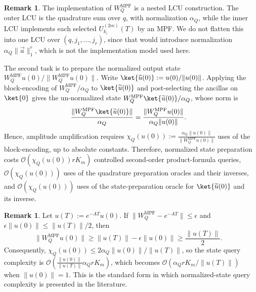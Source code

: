 \documentclass[10pt,reqno]{article}
\numberwithin{equation}{section}
\theoremstyle{plain}
\theoremstyle{definition}
\newtheorem{remark}[thm]{Remark}
\begin{document}
\begin{remark}
The implementation of \(W_Q^{\operatorname{MPF}}\) is a nested LCU construction. The outer LCU is the quadrature sum over \(q\), with normalization \(\alpha_Q\), while the inner LCU implements each selected \(U_{k_i}^{(2m)}(T)\) by an MPF. We do not flatten this into one LCU over \((q,j_1,\ldots,j_r)\), since that would introduce normalization \(\alpha_Q\|\vec a\|_1^r\), which is not the implementation model used here.
\end{remark}

The second task is to prepare the normalized output state \(W_Q^{\operatorname{MPF}}u(0)/\|W_Q^{\operatorname{MPF}}u(0)\|\). Write \(\ket{\widetilde u(0)}:=u(0)/\|u(0)\|\). Applying the block-encoding of \(W_Q^{\operatorname{MPF}}/\alpha_Q\) to \(\ket{\widetilde u(0)}\) and post-selecting the ancillas on \(\ket{0}\) gives the un-normalized state
\(W_Q^{\operatorname{MPF}}\ket{\widetilde u(0)}/\alpha_Q\), whose norm is
\begin{equation}
\frac{\|W_Q^{\operatorname{MPF}}\ket{\widetilde u(0)}\|} {\alpha_Q} = \frac{\|W_Q^{\operatorname{MPF}}u(0)\|} {\alpha_Q\|u(0)\|}.
\end{equation}
Hence, amplitude amplification requires \(\chi_Q(u(0)) := \frac{\alpha_Q\|u(0)\|}{\|W_Q^{\operatorname{MPF}}u(0)\|}\) uses of the block-encoding, up to absolute constants. Therefore, normalized state preparation costs \(\mathcal O(\chi_Q(u(0))rK_m)\) controlled second-order product-formula queries, \(\mathcal O(\chi_Q(u(0)))\) uses of the quadrature preparation oracles and their inverses, and \(\mathcal O(\chi_Q(u(0)))\) uses of the state-preparation oracle for \(\ket{\widetilde u(0)}\) and its inverse.

\begin{remark}\label{state-norm-1}
Let \(u(T):=e^{-AT}u(0)\). If \(\|W_Q^{\operatorname{MPF}}-e^{-AT}\|\le \epsilon\) and \(\epsilon\|u(0)\|\le \|u(T)\|/2\), then \begin{equation} \|W_Q^{\operatorname{MPF}}u(0)\|\ge \|u(T)\| - \epsilon\|u(0)\|\ge \frac{\|u(T)\|}{2}. \end{equation} Consequently, \(\chi_Q(u(0))\le 2\alpha_Q\|u(0)\|/\|u(T)\|\), so the state query complexity is \(\mathcal O\!\left( \frac{\|u(0)\|}{\|u(T)\|}\alpha_Q rK_m \right)\), which becomes \(\mathcal O(\alpha_Q rK_m/\|u(T)\|)\) when \(\|u(0)\|=1\). This is the standard form in which normalized-state query complexity is presented in the literature.
\end{remark}
\end{document}
